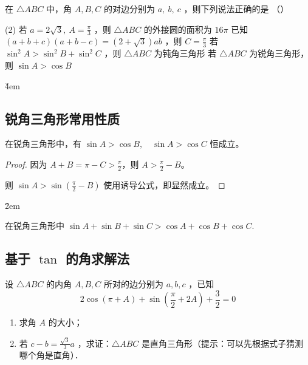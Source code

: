 \begin{example}
    在 $\triangle A B C$ 中，角 $A, B, C$ 的对边分别为 $a, ~ b, ~ c$ ，则下列说法正确的是 （\qquad）
    \begin{tasks}(2)
        \task 若 $a=2 \sqrt{3}, ~ A=\frac{\pi}{3}$ ，则 $\triangle A B C$ 的外接圆的面积为 $16 \pi$
        \task 已知 $(a+b+c)(a+b-c)=(2+\sqrt{3}) a b$ ，则 $C=\frac{\pi}{3}$
        \task 若 $\sin ^2 A>\sin ^2 B+\sin ^2 C$ ，则 $\triangle A B C$ 为钝角三角形
        \task 若 $\triangle A B C$ 为锐角三角形，则 $\sin A>\cos B$
    \end{tasks}
\end{example}

\v{4em}

\subsection{锐角三角形常用性质}

\begin{theorem}
    在锐角三角形中，有 $\sin A > \cos B, \quad \sin A > \cos C$ 恒成立。
\end{theorem}

\begin{proof}
    因为 $A + B = \pi - C > \frac{\pi}{2}$，则 $A > \frac{\pi}{2} - B$。

    则 $\sin A > \sin (\frac{\pi}{2} - B)$ 使用诱导公式，即显然成立。
\end{proof}

\v{2em}

\begin{corollary}
    在锐角三角形中 $\sin A+\sin B+\sin C>\cos A+\cos B+\cos C$.
\end{corollary}

\subsection{基于 $\tan$ 的角求解法}

\begin{example}
    设 $\triangle A B C$ 的内角 $A, B, C$ 所对的边分别为 $a, b, c$ ，已知
    $$
        2 \cos (\pi+A)+\sin \left(\frac{\pi}{2}+2 A\right)+\frac{3}{2}=0
    $$
    \begin{enumerate}
        \item 求角 $A$ 的大小；
        \item 若 $c-b=\frac{\sqrt{3}}{3} a$ ，求证：$\triangle A B C$ 是直角三角形（提示：可以先根据式子猜测哪个角是直角）．
    \end{enumerate}
\end{example}

